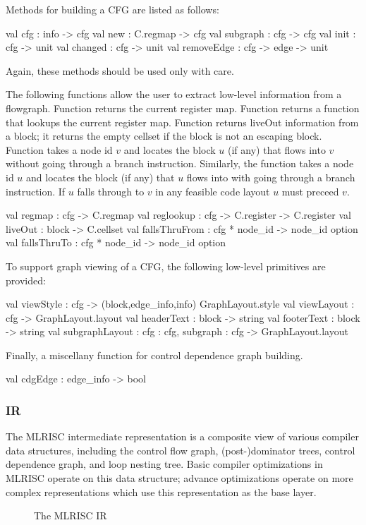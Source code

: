    Methods for building a CFG are listed as follows:
\begin{SML}
   val cfg      : info -> cfg    
   val new      : C.regmap -> cfg
   val subgraph : cfg -> cfg     
   val init     : cfg -> unit    
   val changed  : cfg -> unit   
   val removeEdge : cfg -> edge -> unit
\end{SML}
 Again, these methods should be used only with care.

  The following functions allow the user to extract low-level information
from a flowgraph.  Function  returns the current register map.
Function  returns a function that lookups the current register
map.  Function  returns liveOut information from a block;
it returns the empty cellset if the block is not an escaping block.
Function  takes a node id $v$ and locates the
block $u$ (if any) that flows into $v$ without going through a branch
instruction.  Similarly, the function   takes
a node id $u$ and locates the block (if any) that $u$ flows into
with going through a branch instruction.  If $u$ falls through to
$v$ in any feasible code layout $u$ must preceed $v$.
\begin{SML}
   val regmap    : cfg -> C.regmap
   val reglookup : cfg -> C.register -> C.register
   val liveOut   : block -> C.cellset
   val fallsThruFrom : cfg * node_id -> node_id option
   val fallsThruTo   : cfg * node_id -> node_id option
\end{SML}

   To support graph viewing of a CFG, the following low-level
primitives are provided: 
\begin{SML}
   val viewStyle      : cfg -> (block,edge_info,info) GraphLayout.style
   val viewLayout     : cfg -> GraphLayout.layout
   val headerText     : block -> string
   val footerText     : block -> string
   val subgraphLayout : { cfg : cfg, subgraph : cfg } -> GraphLayout.layout
\end{SML}

   Finally, a miscellany function for control dependence graph building.
\begin{SML} 
   val cdgEdge : edge_info -> bool
\end{SML}

\subsubsection{IR}
The MLRISC intermediate representation is a composite
view of various compiler data structures, including the control
flow graph, (post-)dominator trees, control dependence graph, and
loop nesting tree.   Basic compiler optimizations in MLRISC
operate on this data structure; advance optimizations
operate on more complex representations which use this
representation as the base layer.  
\begin{wrapfigure}{r}{4.5in}
   \begin{Boxit}
   \end{Boxit}
   \caption{The MLRISC IR}
\end{wrapfigure}

